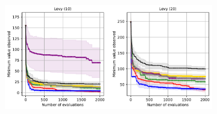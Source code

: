 \begin{figure}[]
\begin{subfigure}[b]{\textwidth}
        \centering
        \includegraphics[width=\textwidth]{Figures/Neural-BO/L1.pdf}
    \end{subfigure}
    \label{fig:neural-bo_synthetic_1}
\end{figure}



